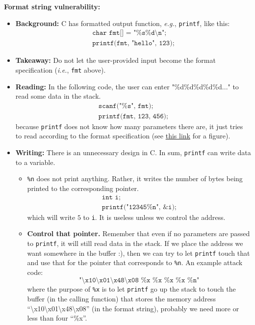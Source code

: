 \documentclass{article}
\newcommand{\parhead}[1]{\noindent \textbf{#1}}
\begin{document}
\parhead{Format string vulnerability:}
\begin{itemize}
    \item \textbf{Background:} C has formatted output function, \emph{e.g.}, \texttt{printf}, like this:
    \[
    \begin{array}{l}
    \texttt{char fmt[] = "\%s\%d\textbackslash n";}\\
    \texttt{printf(fmt, "hello", 123);}
    \end{array}
    \]
    \item \textbf{Takeaway:} Do not let the user-provided input become the format specification (\emph{i.e.}, \texttt{fmt} above). 
    
    \item \textbf{Reading:} In the following code, the user can enter "\%d\%d\%d\%d\%d..." to read some data in the stack.
    \[
    \begin{array}{l}
    \texttt{scanf("\%s", fmt);}\\
    \texttt{printf(fmt, 123, 456);}
    \end{array}
    \]
    because \texttt{printf} does not know how many parameters there are, it just tries to read according to the format specification (see \href{http://www.cis.syr.edu/~wedu/Teaching/cis643/LectureNotes_New/Format_String.pdf}{this link} for a figure). 
    
    \clearpage
    \item \textbf{Writing:} There is an unnecessary design in C. In sum, \texttt{printf} can write data to a variable. 
    \begin{itemize}
        \item \texttt{\%n} does not print anything. Rather, it writes the number of bytes being printed to the corresponding pointer.
        \[
        \begin{array}{l}
        \texttt{int i;}\\
        \texttt{printf("12345\%n", \&i);}
        \end{array}
        \]
        which will write $5$ to \texttt{i}. It is useless unless we control the address. 
        
        \item \textbf{Control that pointer.} Remember that even if no parameters are passed to \texttt{printf}, it will still read data in the stack. If we place the address we want somewhere in the buffer :), then we can try to let \texttt{printf} touch that and use that for the pointer that corresponds to \texttt{\%n}. An example attack code:
        \[
        \texttt{"\textbackslash x10\textbackslash x01\textbackslash x48\textbackslash x08~\%x~\%x~\%x~\%x~\%n"}
        \]
        where the purpose of \texttt{\%x} is to let \texttt{printf} go up the stack to touch the buffer (in the calling function) that stores the memory address ``\textbackslash x10\textbackslash x01\textbackslash x48\textbackslash x08'' (in the format string), probably we need more or less than four ``\%x''.
    \end{itemize}
\end{itemize}
\end{document}
